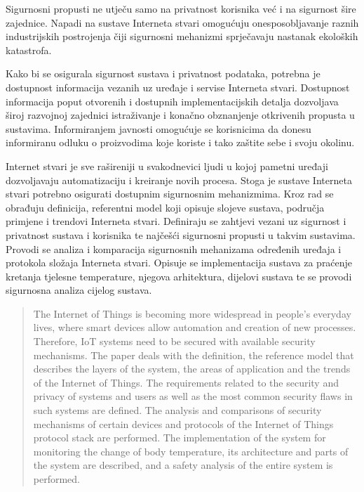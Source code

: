 \documentclass[times, utf8, diplomski]{fer}
\begin{document}
Sigurnosni propusti ne utječu samo na privatnost korisnika već i na sigurnost šire zajednice. Napadi na sustave Interneta stvari omogućuju onesposobljavanje raznih industrijskih postrojenja čiji sigurnosni mehanizmi sprječavaju nastanak ekoloških katastrofa.

Kako bi se osigurala sigurnost sustava i privatnost podataka, potrebna je dostupnost informacija vezanih uz uređaje i servise Interneta stvari. Dostupnost informacija poput otvorenih i dostupnih implementacijskih detalja dozvoljava široj razvojnoj zajednici istraživanje i konačno obznanjenje otkrivenih propusta u sustavima. Informiranjem javnosti omogućuje se korisnicima da donesu informiranu odluku o proizvodima koje koriste i tako zaštite sebe i svoju okolinu.  



\listoffigures
\listoftables

\begin{sazetak}
Internet stvari je sve rašireniji u svakodnevici ljudi u kojoj pametni uređaji dozvoljavaju automatizaciju i kreiranje novih procesa. Stoga je sustave Interneta stvari potrebno osigurati dostupnim sigurnosnim mehanizmima. Kroz rad se obrađuju definicija, referentni model koji opisuje slojeve sustava, područja primjene i trendovi Interneta stvari. Definiraju se zahtjevi vezani uz sigurnost i privatnost sustava i korisnika te najčešći sigurnosni propusti u takvim sustavima. Provodi se analiza i komparacija sigurnosnih mehanizama određenih uređaja i protokola složaja Interneta stvari. Opisuje se implementacija sustava za praćenje kretanja tjelesne temperature, njegova arhitektura, dijelovi sustava te se provodi sigurnosna analiza cijelog sustava.  

\end{sazetak}

\newpage
{}
\begin{abstract}
The Internet of Things is becoming more widespread in people's everyday lives, where smart devices allow automation and creation of new processes. Therefore, IoT systems need to be secured with available security mechanisms. The paper deals with the definition, the reference model that describes the layers of the system, the areas of application and the trends of the Internet of Things. The requirements related to the security and privacy of systems and users as well as the most common security flaws in such systems are defined. The analysis and comparisons of security mechanisms of certain devices and protocols of the Internet of Things protocol stack are performed. The implementation of the system for monitoring the change of body temperature, its architecture and parts of the system are described, and a safety analysis of the entire system is performed.

\end{abstract}
\end{document}
